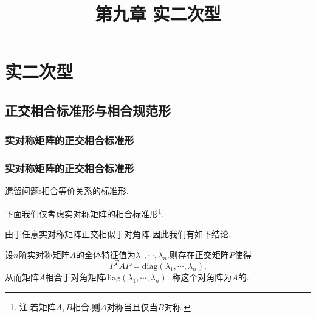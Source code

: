 \renewcommand{\mydate}{2025年06月12日\ 二十九次课}
\makeatletter
\ifodd\value{page}
\else
\begin{frame}[plain]
\end{frame}
\fi
\makeatother

\section{实二次型}


\title{第九章 \quad 实二次型}
\author{}
\date{}

\frame{\titlepage}


\subsection{正交相合标准形与相合规范形}


\subsubsection{实对称矩阵的正交相合标准形}
\begin{frame}\frametitle{实对称矩阵的正交相合标准形}

遗留问题:相合等价关系的标准形.
\pp


下面我们仅考虑实对称矩阵的相合标准形\footnote{注:若矩阵$A,B$相合,则$A$对称当且仅当$B$对称.}.
\pp

\bigskip

由于任意实对称矩阵正交相似于对角阵,因此我们有如下结论.
\begin{proposition}[正交相合标准形]
设$n$阶实对称矩阵$A$的全体特征值为$\lambda_1,\cdots,\lambda_n$.则存在正交矩阵$P$使得
\[P^TAP=\mathrm{diag}(\lambda_1,\cdots,\lambda_n).\]
从而矩阵$A$相合于对角矩阵$\mathrm{diag}(\lambda_1,\cdots,\lambda_n)$.
\pp
称这个对角阵为$A$的.
\end{proposition}
\end{frame}







